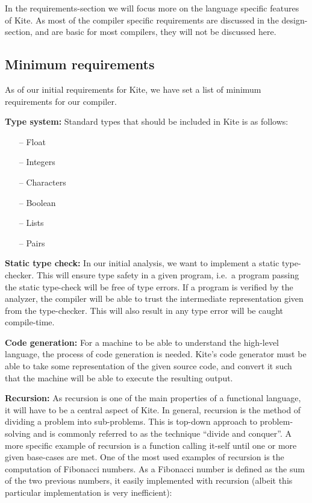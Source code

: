 In the requirements-section we will focus more on the language specific features of Kite. As most of the compiler specific requirements are discussed in the design-section, and are basic for most compilers, they will not be discussed here.

\subsection{Minimum requirements}
As of our initial requirements for Kite, we have set a list of minimum requirements for our compiler.

\textbf{Type system:} Standard types that should be included in Kite is as follows:
\begin{itemize}
\item [--] Float
\item [--] Integers
\item [--] Characters
\item [--] Boolean
\item [--] Lists
\item [--] Pairs
\end{itemize}

\textbf{Static type check:}
In our initial analysis, we want to implement a static type-checker. This will ensure type safety in a given program, i.e.\ a program passing the static type-check will be free of type errors. If a program is verified by the analyzer, the compiler will be able to trust the intermediate representation given from the type-checker. This will also result in any type error will be caught compile-time.

\textbf{Code generation:}
For a machine to be able to understand the high-level language, the process of code generation is needed. Kite's code generator must be able to take some representation of the given source code, and convert it such that the machine will be able to execute the resulting output.

\textbf{Recursion:}
As recursion is one of the main properties of a functional language, it will have to be a central aspect of Kite. In general, recursion is the method of dividing a problem into sub-problems. This is top-down approach to problem-solving and is commonly referred to as the technique ``divide and conquer''. A more specific example of recursion is a function calling it-self until one or more given base-cases are met. One of the most used examples of recursion is the computation of Fibonacci numbers. As a Fibonacci number is defined as the sum of the two previous numbers, it easily implemented with recursion (albeit this particular implementation is very inefficient):

